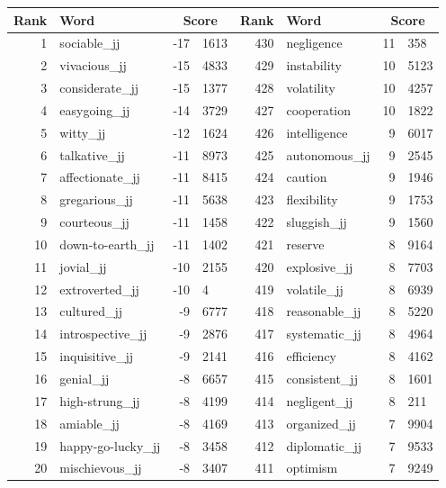 \begin{table}[tbp]
    \begin{tabular}{| rlr@{.}l | rlr@{.}l |}
    \hline
    \textbf{Rank} & \textbf{Word} & \multicolumn{2}{c|}{\textbf{Score}} & \textbf{Rank} & \textbf{Word} & \multicolumn{2}{c|}{\textbf{Score}} \\
    \hline
    1 & sociable\_jj & -17 & 1613    &    430 & negligence & 11 & 358 \\
    2 & vivacious\_jj & -15 & 4833    &    429 & instability & 10 & 5123 \\
    3 & considerate\_jj & -15 & 1377    &    428 & volatility & 10 & 4257 \\
    4 & easygoing\_jj & -14 & 3729    &    427 & cooperation & 10 & 1822 \\
    5 & witty\_jj & -12 & 1624    &    426 & intelligence & 9 & 6017 \\
    6 & talkative\_jj & -11 & 8973    &    425 & autonomous\_jj & 9 & 2545 \\
    7 & affectionate\_jj & -11 & 8415    &    424 & caution & 9 & 1946 \\
    8 & gregarious\_jj & -11 & 5638    &    423 & flexibility & 9 & 1753 \\
    9 & courteous\_jj & -11 & 1458    &    422 & sluggish\_jj & 9 & 1560 \\
    10 & down-to-earth\_jj & -11 & 1402    &    421 & reserve & 8 & 9164 \\
    11 & jovial\_jj & -10 & 2155    &    420 & explosive\_jj & 8 & 7703 \\
    12 & extroverted\_jj & -10 & 4    &    419 & volatile\_jj & 8 & 6939 \\
    13 & cultured\_jj & -9 & 6777    &    418 & reasonable\_jj & 8 & 5220 \\
    14 & introspective\_jj & -9 & 2876    &    417 & systematic\_jj & 8 & 4964 \\
    15 & inquisitive\_jj & -9 & 2141    &    416 & efficiency & 8 & 4162 \\
    16 & genial\_jj & -8 & 6657    &    415 & consistent\_jj & 8 & 1601 \\
    17 & high-strung\_jj & -8 & 4199    &    414 & negligent\_jj & 8 & 211 \\
    18 & amiable\_jj & -8 & 4169    &    413 & organized\_jj & 7 & 9904 \\
    19 & happy-go-lucky\_jj & -8 & 3458    &    412 & diplomatic\_jj & 7 & 9533 \\
    20 & mischievous\_jj & -8 & 3407    &    411 & optimism & 7 & 9249 \\

\end{tabular}
\end{table}
